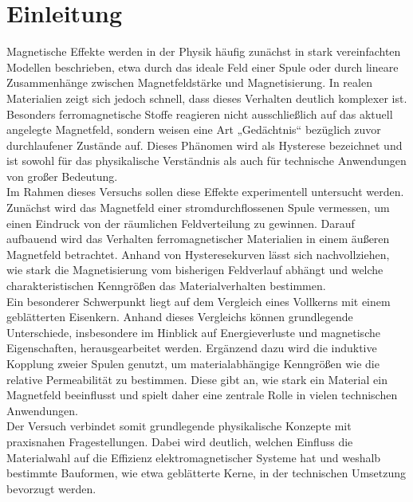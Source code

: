 \section{Einleitung}
Magnetische Effekte werden in der Physik häufig zunächst in stark vereinfachten Modellen beschrieben, etwa durch das ideale Feld einer Spule oder durch lineare Zusammenhänge zwischen Magnetfeldstärke und Magnetisierung. In realen Materialien zeigt sich jedoch schnell, dass dieses Verhalten deutlich komplexer ist. Besonders ferromagnetische Stoffe reagieren nicht ausschließlich auf das aktuell angelegte Magnetfeld, sondern weisen eine Art „Gedächtnis“ bezüglich zuvor durchlaufener Zustände auf. Dieses Phänomen wird als Hysterese bezeichnet und ist sowohl für das physikalische Verständnis als auch für technische Anwendungen von großer Bedeutung. \\
Im Rahmen dieses Versuchs sollen diese Effekte experimentell untersucht werden. Zunächst wird das Magnetfeld einer stromdurchflossenen Spule vermessen, um einen Eindruck von der räumlichen Feldverteilung zu gewinnen. Darauf aufbauend wird das Verhalten ferromagnetischer Materialien in einem äußeren Magnetfeld betrachtet. Anhand von Hysteresekurven lässt sich nachvollziehen, wie stark die Magnetisierung vom bisherigen Feldverlauf abhängt und welche charakteristischen Kenngrößen das Materialverhalten bestimmen. \\ 
Ein besonderer Schwerpunkt liegt auf dem Vergleich eines Vollkerns mit einem geblätterten Eisenkern. Anhand dieses Vergleichs können grundlegende Unterschiede, insbesondere im Hinblick auf Energieverluste und magnetische Eigenschaften, herausgearbeitet werden. Ergänzend dazu wird die induktive Kopplung zweier Spulen genutzt, um materialabhängige Kenngrößen wie die relative Permeabilität zu bestimmen. Diese gibt an, wie stark ein Material ein Magnetfeld beeinflusst und spielt daher eine zentrale Rolle in vielen technischen Anwendungen. \\
Der Versuch verbindet somit grundlegende physikalische Konzepte mit praxisnahen Fragestellungen. Dabei wird deutlich, welchen Einfluss die Materialwahl auf die Effizienz elektromagnetischer Systeme hat und weshalb bestimmte Bauformen, wie etwa geblätterte Kerne, in der technischen Umsetzung bevorzugt werden.